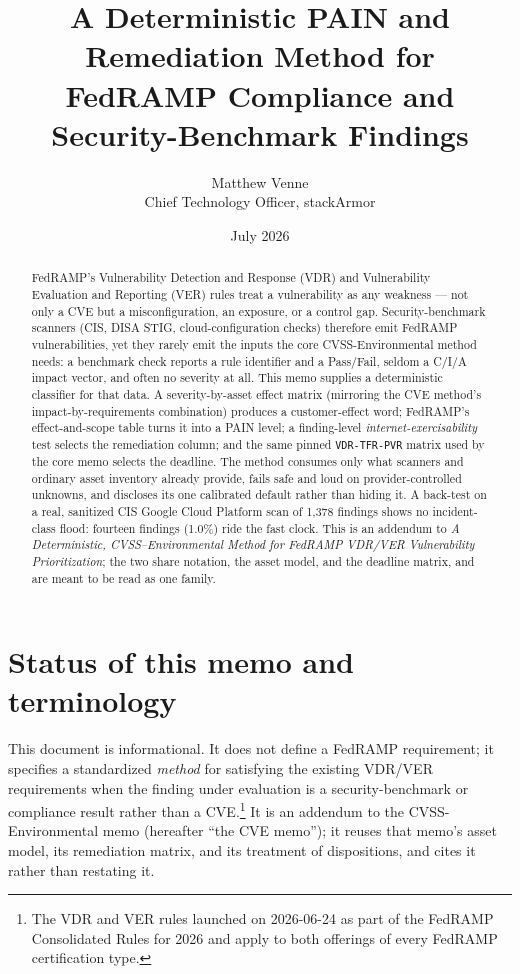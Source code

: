 \documentclass[11pt]{article}
\title{\bfseries A Deterministic PAIN and Remediation Method for\\
FedRAMP Compliance and Security-Benchmark Findings}
\author{Matthew Venne \\ \small Chief Technology Officer, stackArmor}
\date{July 2026}
\newcommand{\code}[1]{\texttt{#1}}
\begin{document}
\maketitle

\begin{abstract}
\noindent
FedRAMP's Vulnerability Detection and Response (VDR) and Vulnerability Evaluation
and Reporting (VER) rules treat a vulnerability as any weakness --- not only a CVE
but a misconfiguration, an exposure, or a control gap. Security-benchmark scanners
(CIS, DISA STIG, cloud-configuration checks) therefore emit FedRAMP vulnerabilities,
yet they rarely emit the inputs the core CVSS-Environmental method needs: a
benchmark check reports a rule identifier and a Pass/Fail, seldom a C/I/A impact
vector, and often no severity at all. This memo supplies a deterministic classifier
for that data. A severity-by-asset effect matrix (mirroring the CVE method's
impact-by-requirements combination) produces a customer-effect word; FedRAMP's
effect-and-scope table turns it into a PAIN level; a finding-level
\emph{internet-exercisability} test selects the remediation column; and the same
pinned \code{VDR-TFR-PVR} matrix used by the core memo selects the deadline.
The method consumes only what scanners and ordinary asset inventory already provide,
fails safe and loud on provider-controlled unknowns, and discloses its one
calibrated default rather than hiding it. A back-test on a real, sanitized CIS Google
Cloud Platform scan of 1{,}378 findings shows no incident-class flood: fourteen
findings (1.0\%) ride the fast clock. This is an addendum to \emph{A Deterministic,
CVSS--Environmental Method for FedRAMP VDR/VER Vulnerability Prioritization};
the two share notation, the asset model, and the deadline matrix, and are meant to
be read as one family.
\end{abstract}

\tableofcontents

\section{Status of this memo and terminology}
This document is informational. It does not define a FedRAMP requirement; it
specifies a standardized \emph{method} for satisfying the existing VDR/VER
requirements when the finding under evaluation is a security-benchmark or
compliance result rather than a CVE.\footnote{The VDR and VER rules launched on
2026-06-24 as part of the FedRAMP Consolidated Rules for 2026 and apply to both
offerings of every FedRAMP certification type.} It is an addendum to the CVSS-Environmental memo
(hereafter ``the CVE memo''); it reuses that memo's asset model, its remediation
matrix, and its treatment of dispositions, and cites it rather than restating it.
\end{document}
